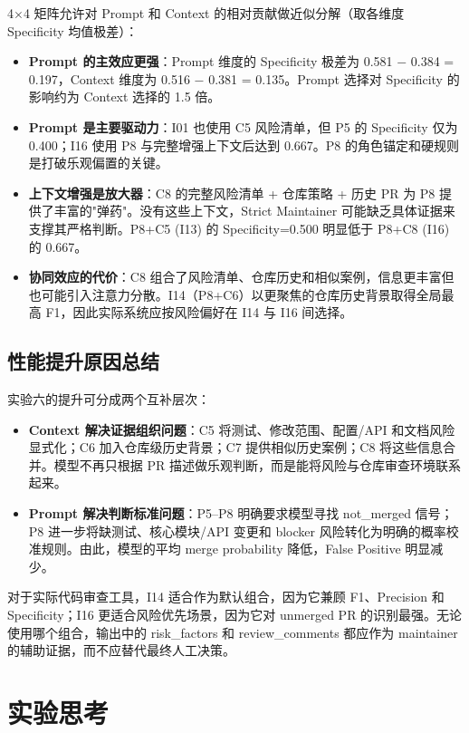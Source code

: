 \documentclass{experimentreport}
\begin{document}
4$\times$4 矩阵允许对 Prompt 和 Context 的相对贡献做近似分解（取各维度 Specificity 均值极差）：

\begin{itemize}
    \item \textbf{Prompt 的主效应更强}：Prompt 维度的 Specificity 极差为 0.581 $-$ 0.384 = 0.197，Context 维度为 0.516 $-$ 0.381 = 0.135。Prompt 选择对 Specificity 的影响约为 Context 选择的 1.5 倍。
    \item \textbf{Prompt 是主要驱动力}：I01 也使用 C5 风险清单，但 P5 的 Specificity 仅为 0.400；I16 使用 P8 与完整增强上下文后达到 0.667。P8 的角色锚定和硬规则是打破乐观偏置的关键。
    \item \textbf{上下文增强是放大器}：C8 的完整风险清单 + 仓库策略 + 历史 PR 为 P8 提供了丰富的"弹药"。没有这些上下文，Strict Maintainer 可能缺乏具体证据来支撑其严格判断。P8+C5 (I13) 的 Specificity=0.500 明显低于 P8+C8 (I16) 的 0.667。
    \item \textbf{协同效应的代价}：C8 组合了风险清单、仓库历史和相似案例，信息更丰富但也可能引入注意力分散。I14（P8+C6）以更聚焦的仓库历史背景取得全局最高 F1，因此实际系统应按风险偏好在 I14 与 I16 间选择。
\end{itemize}

\subsection{性能提升原因总结}

实验六的提升可分成两个互补层次：
\begin{itemize}
    \item \textbf{Context 解决证据组织问题}：C5 将测试、修改范围、配置/API 和文档风险显式化；C6 加入仓库级历史背景；C7 提供相似历史案例；C8 将这些信息合并。模型不再只根据 PR 描述做乐观判断，而是能将风险与仓库审查环境联系起来。
    \item \textbf{Prompt 解决判断标准问题}：P5--P8 明确要求模型寻找 not\_merged 信号；P8 进一步将缺测试、核心模块/API 变更和 blocker 风险转化为明确的概率校准规则。由此，模型的平均 merge probability 降低，False Positive 明显减少。
\end{itemize}

对于实际代码审查工具，I14 适合作为默认组合，因为它兼顾 F1、Precision 和 Specificity；I16 更适合风险优先场景，因为它对 unmerged PR 的识别最强。无论使用哪个组合，输出中的 risk\_factors 和 review\_comments 都应作为 maintainer 的辅助证据，而不应替代最终人工决策。

\section{实验思考}
\end{document}
